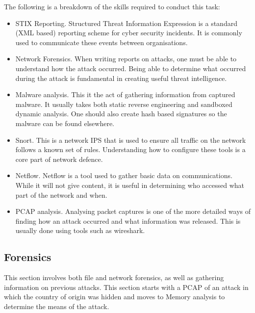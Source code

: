 \documentclass[a4paper,11pt]{report}
\begin{document}
			The following is a breakdown of the skills required to conduct this task:
			\begin{itemize}
				\item STIX Reporting.
					Structured Threat Information Expression is a standard (XML based) reporting scheme for cyber security incidents. 
					It is commonly used to communicate these events between organisations.
				\item Network Forensics.
					When writing reports on attacks, one must be able to understand how the attack occurred. 
					Being able to determine what occurred during the attack is fundamental in creating useful threat intelligence. 
				\item Malware analysis.
					This it the act of gathering information from captured malware. 
					It usually takes both static reverse engineering and sandboxed dynamic analysis. 
					One should also create hash based signatures so the malware can be found elsewhere. 
				\item Snort. 
					This is a network IPS that is used to ensure all traffic on the network follows a known set of rules. 
					Understanding how to configure these tools is a core part of network defence. 
				\item Netflow.
					Netflow is a tool used to gather basic data on communications. 
					While it will not give content, it is useful in determining who accessed what part of the network and when. 
				\item PCAP analysis. 
					Analysing packet captures is one of the more detailed ways of finding how an attack occurred and what information was released. 
					This is usually done using tools such as wireshark. 
			\end{itemize}
		\subsection{Forensics}
			This section involves both file and network forensics, as well as gathering information on previous attacks. 
			This section starts with a PCAP of an attack in which the country of origin was hidden and moves to Memory analysis to determine the means of the attack. 
			
\end{document}
